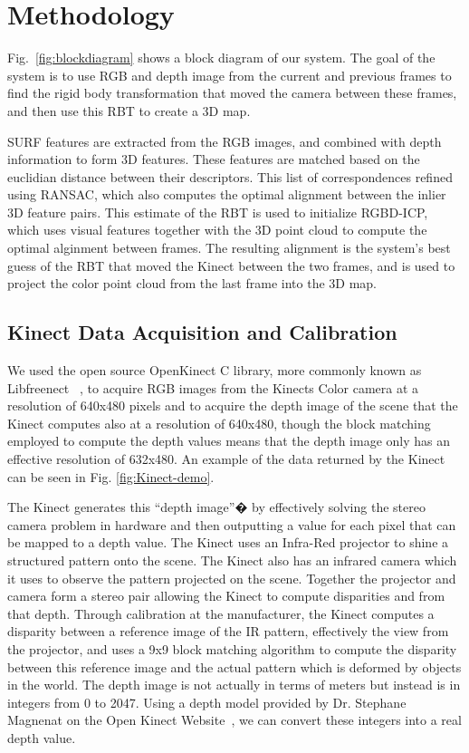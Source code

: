 \documentclass[letterpaper, 10pt, conference]{ieeeconf}
\begin{document}
\section{Methodology}
Fig.~\ref{fig:blockdiagram} shows a block diagram of our system. The goal of the system is
to use RGB and depth image from the current and previous frames to find the rigid body transformation that moved
the camera between these frames, and then use this RBT to create a 3D map.

SURF features are extracted from the RGB images, and combined with depth information to form 3D features.
These features are matched based on the euclidian distance between their descriptors.
This list of correspondences refined using RANSAC, which also computes the optimal alignment between the inlier 3D feature pairs. This estimate of the RBT is used to initialize RGBD-ICP, which uses visual features together with the 3D point cloud to compute the optimal alginment between frames. The resulting alignment is the system's best guess of the RBT that moved the Kinect between the
two frames, and is used to project the color point cloud from the last frame into the 3D map.

\subsection{Kinect Data Acquisition and Calibration}

We used the open source OpenKinect C library, more commonly known as Libfreenect ~\cite{OpenKinect}, to acquire RGB images from the Kinects Color camera at a resolution of 640x480 pixels and to acquire the depth image of the scene that the Kinect computes also at a resolution of 640x480, though the block matching employed to compute the depth values means that the depth image only has an effective resolution of 632x480. An example of the data returned by the Kinect can be seen in Fig. \ref{fig:Kinect-demo}.

The Kinect generates this ``depth image''� by effectively solving the stereo camera problem in hardware and then outputting a value for each pixel that can be mapped to a depth value.  The Kinect uses an Infra-Red projector to shine a structured pattern onto the scene.  The Kinect also has an infrared camera which it uses to observe the pattern projected on the scene.  Together the projector and camera form a stereo pair allowing the Kinect to compute disparities and from that depth.  Through calibration at the manufacturer, the Kinect computes a disparity between a reference image of the IR pattern, effectively the view from the projector, and uses a 9x9 block matching algorithm to compute the disparity between this reference image and the actual pattern which is deformed by objects in the world.  The depth image is not actually in terms of meters but instead is in integers from 0 to 2047.  Using a depth model provided by Dr. Stephane Magnenat on the Open Kinect Website~\cite{OpenKinect}, we can convert these integers into a real depth value.  
\end{document}

